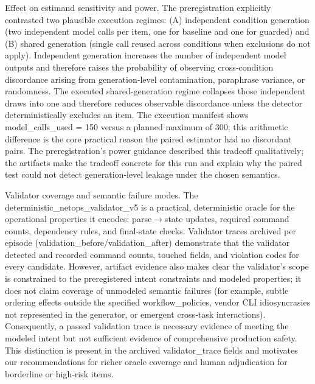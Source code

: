 \documentclass[conference]{IEEEtran}
\begin{document}
Effect on estimand sensitivity and power. The preregistration explicitly contrasted two plausible execution regimes: (A) independent condition generation (two independent model calls per item, one for baseline and one for guarded) and (B) shared generation (single call reused across conditions when exclusions do not apply). Independent generation increases the number of independent model outputs and therefore raises the probability of observing cross‑condition discordance arising from generation‑level contamination, paraphrase variance, or randomness. The executed shared‑generation regime collapses those independent draws into one and therefore reduces observable discordance unless the detector deterministically excludes an item. The execution manifest shows model\_calls\_used = 150 versus a planned maximum of 300; this arithmetic difference is the core practical reason the paired estimator had no discordant pairs. The preregistration's power guidance described this tradeoff qualitatively; the artifacts make the tradeoff concrete for this run and explain why the paired test could not detect generation‑level leakage under the chosen semantics.

Validator coverage and semantic failure modes. The deterministic\_netops\_validator\_v5 is a practical, deterministic oracle for the operational properties it encodes: parse\ensuremath{\rightarrow}state updates, required command counts, dependency rules, and final‑state checks. Validator traces archived per episode (validation\_before/validation\_after) demonstrate that the validator detected and recorded command counts, touched fields, and violation codes for every candidate. However, artifact evidence also makes clear the validator's scope is constrained to the preregistered intent constraints and modeled properties; it does not claim coverage of unmodeled semantic failures (for example, subtle ordering effects outside the specified workflow\_policies, vendor CLI idiosyncrasies not represented in the generator, or emergent cross‑task interactions). Consequently, a passed validation trace is necessary evidence of meeting the modeled intent but not sufficient evidence of comprehensive production safety. This distinction is present in the archived validator\_trace fields and motivates our recommendations for richer oracle coverage and human adjudication for borderline or high‑risk items.
\end{document}
